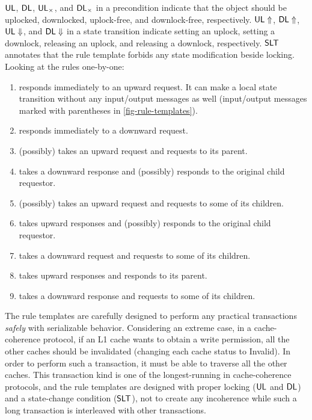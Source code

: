 \documentclass[sigplan,10pt,review,anonymous,screen]{acmart}\settopmatter{printfolios=true,printccs=false,printacmref=false}
\begin{document}
$\textsf{UL}$, $\textsf{DL}$, $\textsf{UL}_{\times}$, and $\textsf{DL}_{\times}$ in a precondition indicate that the object should be uplocked, downlocked, uplock-free, and downlock-free, respectively.
$\textsf{UL}\Uparrow$, $\textsf{DL}\Uparrow$, $\textsf{UL}\Downarrow$, and $\textsf{DL}\Downarrow$ in a state transition indicate setting an uplock, setting a downlock, releasing an uplock, and releasing a downlock, respectively.
$\textsf{SLT}{}$ annotates that the rule template forbids any state modification beside locking.
Looking at the rules one-by-one:
\begin{enumerate}[label=(\alph*),leftmargin=*]
\item {} responds immediately to an upward request. It can make a local state transition without any input/output messages as well (input/output messages marked with parentheses in \autoref{fig-rule-templates}).
\item {} responds immediately to a downward request.
\item {} (possibly) takes an upward request and requests to its parent.
\item {} takes a downward response and (possibly) responds to the original child requestor.
\item {} (possibly) takes an upward request and requests to some of its children.
\item {} takes upward responses and (possibly) responds to the original child requestor.
\item {} takes a downward request and requests to some of its children.
\item {} takes upward responses and responds to its parent.
\item {} takes a downward response and requests to some of its children.
\end{enumerate}

The rule templates are carefully designed to perform any practical transactions \emph{safely} with serializable behavior.
Considering an extreme case, in a cache-coherence protocol, if an L1 cache wants to obtain a write permission, all the other caches should be invalidated (changing each cache status to Invalid).
In order to perform such a transaction, it must be able to traverse all the other caches.
This transaction kind is one of the longest-running in cache-coherence protocols, and the rule templates are designed with proper locking ($\textsf{UL}$ and $\textsf{DL}$) and a state-change condition ($\textsf{SLT}$), not to create any incoherence while such a long transaction is interleaved with other transactions.
\end{document}
